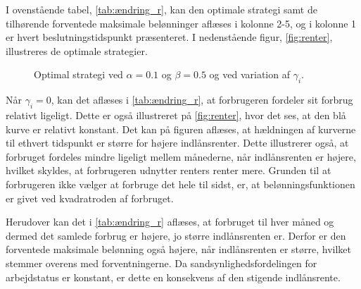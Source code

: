 I ovenstående tabel, \autoref{tab:ændring_r}, kan den optimale strategi samt de tilhørende forventede maksimale belønninger aflæses i kolonne 2-5, og i kolonne 1 er hvert beslutningstidspunkt præsenteret. I nedenstående figur, \autoref{fig:renter}, illustreres de optimale strategier.

\begin{figure}[H]
    \begin{center}
        \resizebox{12cm}{!}{}
    \end{center}
    \caption{Optimal strategi ved $\alpha=0.1$ og $\beta=0.5$ og ved variation af $\gamma_i$.}\label{fig:renter}
\end{figure}

Når $\gamma_i=0$, kan det aflæses i \autoref{tab:ændring_r}, at forbrugeren fordeler sit forbrug relativt ligeligt. Dette er også illustreret på \autoref{fig:renter}, hvor det ses, at den blå kurve er relativt konstant. Det kan på figuren aflæses, at hældningen af kurverne til ethvert tidspunkt er større for højere indlånsrenter. Dette illustrerer også, at forbruget fordeles mindre ligeligt mellem månederne, når indlånsrenten er højere, hvilket skyldes, at forbrugeren udnytter renters renter mere. Grunden til at forbrugeren ikke vælger at forbruge det hele til sidst, er, at belønningsfunktionen er givet ved kvadratroden af forbruget. 

Herudover kan det i \autoref{tab:ændring_r} aflæses, at forbruget til hver måned og dermed det samlede forbrug er højere, jo større indlånsrenten er. Derfor er den forventede maksimale belønning også højere, når indlånsrenten er større, hvilket stemmer overens med forventningerne. Da sandsynlighedsfordelingen for arbejdstatus er konstant, er dette en konsekvens af den stigende indlånsrente.





